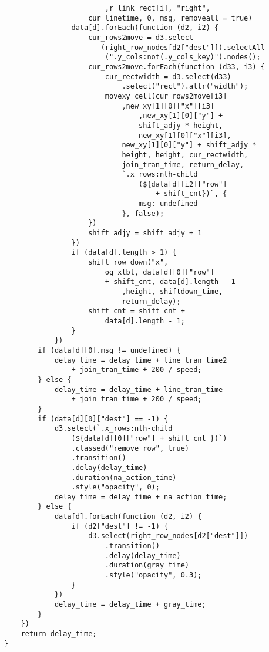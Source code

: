 \begin{lstlisting}
                        ,r_link_rect[i], "right",
                    cur_linetime, 0, msg, removeall = true)
                data[d].forEach(function (d2, i2) {
                    cur_rows2move = d3.select
                       (right_row_nodes[d2["dest"]]).selectAll
                        (".y_cols:not(.y_cols_key)").nodes();
                    cur_rows2move.forEach(function (d33, i3) {
                        cur_rectwidth = d3.select(d33)
                            .select("rect").attr("width");
                        movexy_cell(cur_rows2move[i3]
                            ,new_xy[1][0]["x"][i3]
                                ,new_xy[1][0]["y"] + 
                                shift_adjy * height, 
                                new_xy[1][0]["x"][i3],
                            new_xy[1][0]["y"] + shift_adjy * 
                            height, height, cur_rectwidth, 
                            join_tran_time, return_delay,
                            `.x_rows:nth-child
                                (${data[d][i2]["row"] 
                                    + shift_cnt})`, {
                                msg: undefined
                            }, false);
                    })
                    shift_adjy = shift_adjy + 1
                })
                if (data[d].length > 1) {
                    shift_row_down("x",
                        og_xtbl, data[d][0]["row"] 
                        + shift_cnt, data[d].length - 1
                            ,height, shiftdown_time, 
                            return_delay);
                    shift_cnt = shift_cnt + 
                        data[d].length - 1;
                }
            })
        if (data[d][0].msg != undefined) {
            delay_time = delay_time + line_tran_time2 
                + join_tran_time + 200 / speed;
        } else {
            delay_time = delay_time + line_tran_time 
                + join_tran_time + 200 / speed;
        }
        if (data[d][0]["dest"] == -1) {
            d3.select(`.x_rows:nth-child
                (${data[d][0]["row"] + shift_cnt })`)
                .classed("remove_row", true)
                .transition()
                .delay(delay_time)
                .duration(na_action_time)
                .style("opacity", 0);
            delay_time = delay_time + na_action_time;
        } else {
            data[d].forEach(function (d2, i2) {
                if (d2["dest"] != -1) {
                    d3.select(right_row_nodes[d2["dest"]])
                        .transition()
                        .delay(delay_time)
                        .duration(gray_time)
                        .style("opacity", 0.3);
                }
            })
            delay_time = delay_time + gray_time;
        }
    })
    return delay_time;
}


\end{lstlisting}
